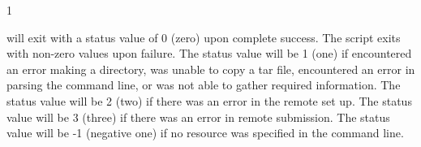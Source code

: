 \begin{ManPage}{\label{man-condor-glidein}}{1}
\begin{Options}
\end{Options}

\ExitStatus

 will exit with a status value of 0 (zero) upon 
complete success.
The script exits with non-zero values upon failure.
The status value will be 1 (one) if 
 encountered an error making a directory,
was unable to copy a tar file,
encountered an error in parsing the command line,
or was not able to gather required information.
The status value will be 2 (two) if 
there was an error in the remote set up.
The status value will be 3 (three) if 
there was an error in remote submission.
The status value will be -1 (negative one) if 
no resource was specified in the command line.

\end{ManPage}
